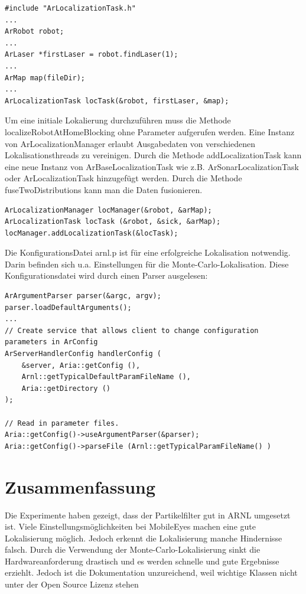 \documentclass{article}
\begin{document}
\lstset{language=C++}
\begin{lstlisting}
#include "ArLocalizationTask.h"
...
ArRobot robot;
...
ArLaser *firstLaser = robot.findLaser(1);
...
ArMap map(fileDir);
...
ArLocalizationTask locTask(&robot, firstLaser, &map);
\end{lstlisting}
Um eine initiale Lokalierung durchzuf\"uhren muss die Methode localizeRobotAtHomeBlocking ohne Parameter aufgerufen werden.
Eine Instanz von ArLocalizationManager erlaubt Ausgabedaten von verschiedenen Lokalisationsthreads zu vereinigen. Durch die Methode addLocalizationTask kann eine neue Instanz von ArBaseLocalizationTask wie z.B. ArSonarLocalizationTask oder ArLocalizationTask hinzugef\"ugt werden. Durch die Methode fuseTwoDistributions kann man die Daten fusionieren.
\lstset{language=C++}
\begin{lstlisting}
ArLocalizationManager locManager(&robot, &arMap);
ArLocalizationTask locTask (&robot, &sick, &arMap);
locManager.addLocalizationTask(&locTask);
\end{lstlisting}

Die KonfigurationsDatei arnl.p ist f\"ur eine erfolgreiche Lokalisation notwendig. Darin befinden sich u.a. Einstellungen f\"ur die Monte-Carlo-Lokalisation.
Diese Konfigurationsdatei wird durch einen Parser ausgelesen:

\lstset{language=C++}
\begin{lstlisting}
ArArgumentParser parser(&argc, argv);
parser.loadDefaultArguments();
...
// Create service that allows client to change configuration parameters in ArConfig 
ArServerHandlerConfig handlerConfig (
	&server, Aria::getConfig (),
	Arnl::getTypicalDefaultParamFileName (),
	Aria::getDirectory ()
);

// Read in parameter files.
Aria::getConfig()->useArgumentParser(&parser);
Aria::getConfig()->parseFile (Arnl::getTypicalParamFileName() )
\end{lstlisting}

\newpage



\section{Zusammenfassung}

Die Experimente haben gezeigt, dass der Partikelfilter gut in ARNL umgesetzt ist. Viele Einstellungsm\"oglichkeiten bei MobileEyes machen eine gute Lokalisierung m\"oglich. Jedoch erkennt die Lokalisierung manche Hindernisse falsch. Durch die Verwendung der Monte-Carlo-Lokalisierung sinkt die Hardwareanforderung drastisch und es werden schnelle und gute Ergebnisse erziehlt. Jedoch ist die Dokumentation unzureichend, weil wichtige Klassen nicht unter der Open Source Lizenz stehen
\end{document}
